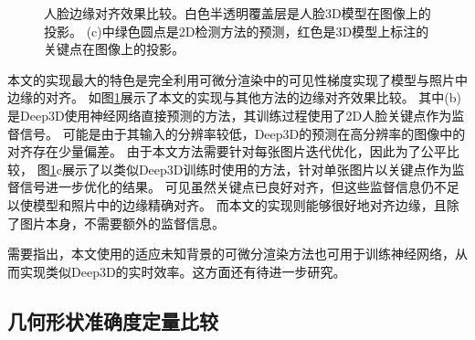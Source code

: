 \begin{figure}[tbh]
\caption[人脸边缘对齐效果比较]{
    人脸边缘对齐效果比较。白色半透明覆盖层是人脸3D模型在图像上的投影。
    (c)中绿色圆点是2D检测方法的预测，红色是3D模型上标注的关键点在图像上的投影。
}
\label{fig:edge_alignment}
\end{figure}
本文的实现最大的特色是完全利用可微分渲染中的可见性梯度实现了模型与照片中边缘的对齐。
如图\ref{fig:edge_alignment}展示了本文的实现与其他方法的边缘对齐效果比较。
其中(b)是Deep3D\citep{deep3d}使用神经网络直接预测的方法，其训练过程使用了2D人脸关键点作为监督信号。
可能是由于其输入的分辨率较低，Deep3D的预测在高分辨率的图像中的对齐存在少量偏差。
由于本文方法需要针对每张图片迭代优化，因此为了公平比较，
图\ref{fig:edge_alignment}c展示了以类似Deep3D训练时使用的方法，针对单张图片以关键点作为监督信号进一步优化的结果。
可见虽然关键点已良好对齐，但这些监督信息仍不足以使模型和照片中的边缘精确对齐。
而本文的实现则能够很好地对齐边缘，且除了图片本身，不需要额外的监督信息。

需要指出，本文使用的适应未知背景的可微分渲染方法也可用于训练神经网络，从而实现类似Deep3D的实时效率。这方面还有待进一步研究。

\subsection{几何形状准确度定量比较}

